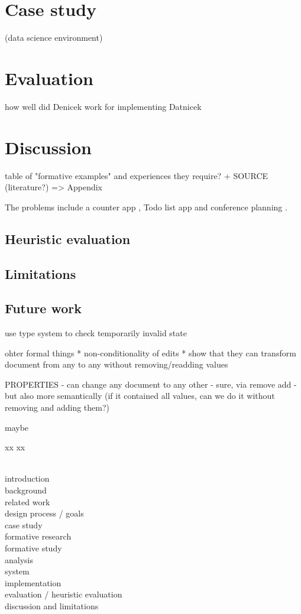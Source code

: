 \documentclass[sigconf,anonymous,screen]{acmart}
\begin{document}
\section{Case study}
\label{sec:case}
(data science environment)

\section{Evaluation}
\label{sec:eval}
how well did Denicek work for implementing Datnicek

\section{Discussion}



table of "formative examples" and experiences they require?
+ SOURCE (literature?) => Appendix

The problems include a counter app \cite{kiss-2014-7guis},
Todo list app and conference planning \cite{edwards-2025-schema}.

\subsection{Heuristic evaluation}
\subsection{Limitations}
\subsection{Future work}
\label{sec:discuss-future}
use type system to check temporarily invalid state

ohter formal things
* non-conditionality of edits
* show that they can transform document from any to any without removing/readding values


PROPERTIES
- can change any document to any other - sure, via remove add - but also more semantically
(if it contained all values, can we do it without removing and adding them?)

maybe



xx
\newpage
xx

~\\
introduction \\
background \\
related work \\
design process / goals \\
case study \\
formative research \\
formative study \\
analysis \\
system \\
implementation \\
evaluation / heuristic evaluation \\
discussion and limitations \\
\end{document}
